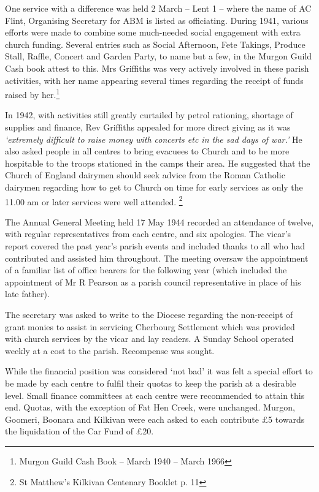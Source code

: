 One service with a difference was held 2 March -- Lent 1 -- where the name of AC Flint, Organising Secretary for ABM is listed as officiating. During 1941, various efforts were made to combine some much-needed social engagement with extra church funding. Several entries such as Social Afternoon, Fete Takings, Produce Stall, Raffle, Concert and Garden Party, to name but a few, in the Murgon Guild Cash book attest to this. Mrs Griffiths was very actively involved in these parish activities, with her name appearing several times regarding the receipt of funds raised by her.\footnote{Murgon Guild Cash Book -- March 1940 -- March 1966}


In 1942, with activities still greatly curtailed by petrol rationing, shortage of supplies and finance, Rev Griffiths appealed for more direct giving as it was \emph{`extremely difficult to raise money with concerts etc in the sad days of war.'} He also asked people in all centres to bring evacuees to Church and to be more hospitable to the troops stationed in the camps their area. He suggested that the Church of England dairymen should seek advice from the Roman Catholic dairymen regarding how to get to Church on time for early services as only the 11.00 am or later services were well attended. \footnote{St Matthew's Kilkivan Centenary Booklet p. 11}


The Annual General Meeting held 17 May 1944 recorded an attendance of twelve, with regular representatives from each centre, and six apologies. The vicar's report covered the past year's parish events and included thanks to all who had contributed and assisted him throughout. The meeting oversaw the appointment of a familiar list of office bearers for the following year (which included the appointment of Mr R Pearson as a parish council representative in place of his late father).



The secretary was asked to write to the Diocese regarding the non-receipt of grant monies to assist in servicing Cherbourg Settlement which was provided with church services by the vicar and lay readers. A Sunday School operated weekly at a cost to the parish. Recompense was sought.



While the financial position was considered `not bad' it was felt a special effort to be made by each centre to fulfil their quotas to keep the parish at a desirable level. Small finance committees at each centre were recommended to attain this end. Quotas, with the exception of Fat Hen Creek, were unchanged. Murgon, Goomeri, Boonara and Kilkivan were each asked to each contribute \pounds5 towards the liquidation of the Car Fund of \pounds20.



